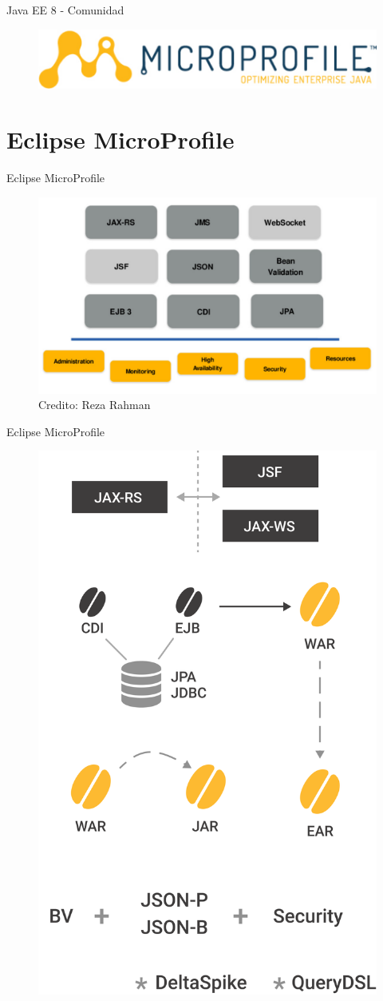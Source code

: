 \documentclass{beamer}
\begin{document}
\begin{frame}{Java EE 8 - Comunidad}
\begin{figure}
	\centering
	\includegraphics[width=0.7\linewidth]{Images/microprofile-logo}
\end{figure}
\end{frame}

\section{Eclipse MicroProfile}

\begin{frame}{Eclipse MicroProfile}
\begin{figure}
	\centering
	\includegraphics[width=\linewidth]{Images/javaeemicropancake}
	\caption{Credito: Reza Rahman}
\end{figure}
\end{frame}

\begin{frame}{Eclipse MicroProfile}
	\begin{figure}
		\centering
		\includegraphics[width=0.5\linewidth]{Images/oldsetup}
	\end{figure}
\end{frame}
\end{document}
